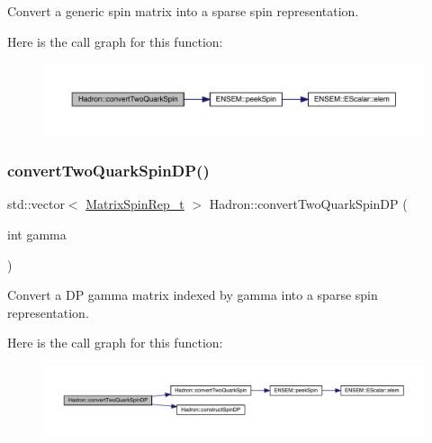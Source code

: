 Convert a generic spin matrix into a sparse spin representation. 

Here is the call graph for this function\+:
\nopagebreak
\begin{figure}[H]
\begin{center}
\leavevmode
\includegraphics[width=350pt]{d1/daf/namespaceHadron_a6bcb90f42724a0f4ce09eeb64bd54c80_cgraph}
\end{center}
\end{figure}
\mbox{\label{namespaceHadron_a9d2555db4b8f920142f7c79e6752eccd}} 
\subsubsection{\texorpdfstring{convertTwoQuarkSpinDP()}{convertTwoQuarkSpinDP()}}
{\footnotesize\ttfamily std\+::vector$<$ \mbox{\hyperlink{structHadron_1_1MatrixSpinRep__t}{Matrix\+Spin\+Rep\+\_\+t}} $>$ Hadron\+::convert\+Two\+Quark\+Spin\+DP (\begin{DoxyParamCaption}\item[{int}]{gamma }\end{DoxyParamCaption})}



Convert a DP gamma matrix indexed by gamma into a sparse spin representation. 

Here is the call graph for this function\+:
\nopagebreak
\begin{figure}[H]
\begin{center}
\leavevmode
\includegraphics[width=350pt]{d1/daf/namespaceHadron_a9d2555db4b8f920142f7c79e6752eccd_cgraph}
\end{center}
\end{figure}
\mbox{\label{namespaceHadron_aadefc7d519d40f16cb37c4df644944e7}} 
